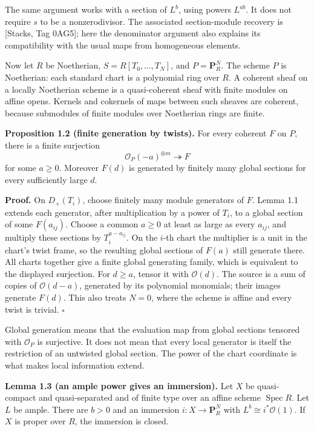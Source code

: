 \documentclass[11pt]{article}
\begin{document}
The same argument works with a section of \(L^b\), using powers
\(L^{ab}\). It does not require \(s\) to be a nonzerodivisor. The
associated section-module recovery is {[}Stacks, Tag 0AG5{]}; here the
denominator argument also explains its compatibility with the usual maps
from homogeneous elements.

Now let \(R\) be Noetherian, \(S=R[T_0,\ldots,T_N]\), and
\(P=\mathbf P_R^N\). The scheme \(P\) is Noetherian: each standard chart
is a polynomial ring over \(R\). A coherent sheaf on a locally
Noetherian scheme is a quasi-coherent sheaf with finite modules on
affine opens. Kernels and cokernels of maps between such sheaves are
coherent, because submodules of finite modules over Noetherian rings are
finite.

\textbf{Proposition 1.2 (finite generation by twists).} For every
coherent \(F\) on \(P\), there is a finite surjection \[
\mathcal O_P(-a)^{\oplus m}\twoheadrightarrow F
\] for some \(a\ge0\). Moreover \(F(d)\) is generated by finitely many
global sections for every sufficiently large \(d\).

\textbf{Proof.} On \(D_+(T_i)\), choose finitely many module generators
of \(F\). Lemma 1.1 extends each generator, after multiplication by a
power of \(T_i\), to a global section of some \(F(a_{ij})\). Choose a
common \(a\ge0\) at least as large as every \(a_{ij}\), and multiply
these sections by \(T_i^{a-a_{ij}}\). On the \(i\)-th chart the
multiplier is a unit in the chart's twist frame, so the resulting global
sections of \(F(a)\) still generate there. All charts together give a
finite global generating family, which is equivalent to the displayed
surjection. For \(d\ge a\), tensor it with \(\mathcal O(d)\). The source
is a sum of copies of \(\mathcal O(d-a)\), generated by its polynomial
monomials; their images generate \(F(d)\). This also treats \(N=0\),
where the scheme is affine and every twist is trivial. \(\square\)

Global generation means that the evaluation map from global sections
tensored with \(\mathcal O_P\) is surjective. It does not mean that
every local generator is itself the restriction of an untwisted global
section. The power of the chart coordinate is what makes local
information extend.

\textbf{Lemma 1.3 (an ample power gives an immersion).} Let \(X\) be
quasi-compact and quasi-separated and of finite type over an affine
scheme \(\operatorname{Spec}R\). Let \(L\) be ample. There are \(b>0\)
and an immersion \(i:X\to\mathbf P_R^N\) with
\(L^b\cong i^*\mathcal O(1)\). If \(X\) is proper over \(R\), the
immersion is closed.
\end{document}
